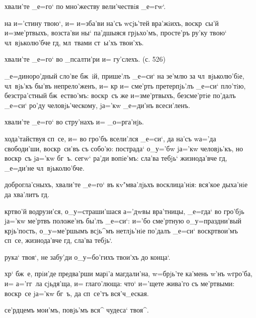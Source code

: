 хвали'те _е=го` по мно'жеству вели'чествiя _е=гw`.

на и='стину твою`, и= и=зба'ви на'съ w\т сjь'тей 
вра'жiихъ, воскр~сы'й и=з\ъ ме'ртвыхъ, возста'ви ны` 
па'дшыяся грjьхо'мъ, просте'ръ ру'ку твою` чл~вjьколю'бче 
гд, мл~твами ст~ы'хъ твои'хъ.

хвали'те _е=го` во _псалти'ри и= гу'слехъ. (с. 526)

_е=диноро'дный сло'ве бж~iй, прише'лъ _е=си` на зе'млю за 
чл~вjьколю'бiе, чл~вjь'къ бы'въ непрело'женъ, и= кр 
и= сме'рть претерпjь'лъ _е=си` пло'тiю, безстра'стный 
бж~ество'мъ: воскр~съ же и=з\ъ ме'ртвыхъ, безсме'ртiе 
по'далъ _е=си` ро'ду человjь'ческому, jа='кw _е=ди'нъ 
всеси'ленъ.


хвали'те _е=го` во стру'нахъ и= _о=рга'нjь.

хода'тайствуя сп~се, и= во гро'бъ всели'лся _е=си`, да 
на'съ w\т а='да свободи'ши, воскр~си'въ съ собо'ю: 
пострада` о_у='бw jа='кw человjь'къ, но воскр~съ jа='кw 
бг~ъ. сегw` ра'ди вопiе'мъ: сла'ва тебjь` жизнода'вче 
гд, _е=ди'не чл~вjьколю'бче.

доброгла'сныхъ, хвали'те _е=го` въ кv"мва'лjьхъ 
восклица'нiя: вся'кое дыха'нiе да хва'литъ гд.

кр тво'й водрузи'ся, о_у=страши'шася а='дwвы 
вра'тницы, _е=гда` во гро'бjь jа='кw ме'ртвъ положе'нъ 
бы'лъ _е=си`: и='бо сме'ртную о_у=праздни'вый крjь'пость, 
о_у=ме'ршымъ всjь^мъ нетлjь'нiе по'далъ _е=си` 
воскр твои'мъ сп~се, жизнода'вче гд, сла'ва 
тебjь`.

рука` твоя`, не забу'ди о_у=бо'гихъ твои'хъ до конца`.

хр` бж~е, прiи'де предва'рши марi'а магдали'на, 
w=брjь'те ка'мень w'нъ w\т гро'ба, и= а='гг~ла 
сjьдя'ща, и= глаго'люща: что` и='щете жива'го съ 
ме'ртвыми: воскр~се jа='кw бг~ъ, да сп~се'тъ вся'ч_еская.

се'рдцемъ мои'мъ, повjь'мъ вся^ чудеса` твоя^.

